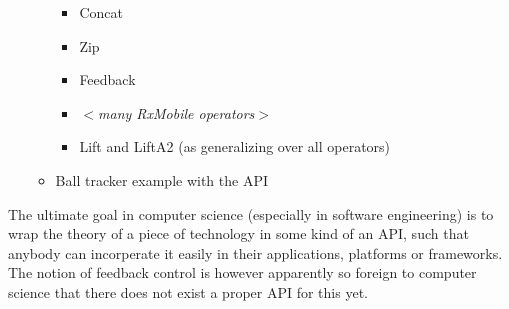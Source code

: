\begin{itemize}
\begin{itemize}
\begin{itemize}
			\item Concat
			\item Zip
			\item Feedback
			\item \textit{$<$many RxMobile operators$>$}
			\item Lift and LiftA2 (as generalizing over all operators)
		\end{itemize}
		\item Ball tracker example with the API
	\end{itemize}
\end{itemize}

The ultimate goal in computer science (especially in software engineering) is to wrap the theory of a piece of technology in some kind of an API, such that anybody can incorperate it easily in their applications, platforms or frameworks. The notion of feedback control is however apparently so foreign to computer science that there does not exist a proper API for this yet. 